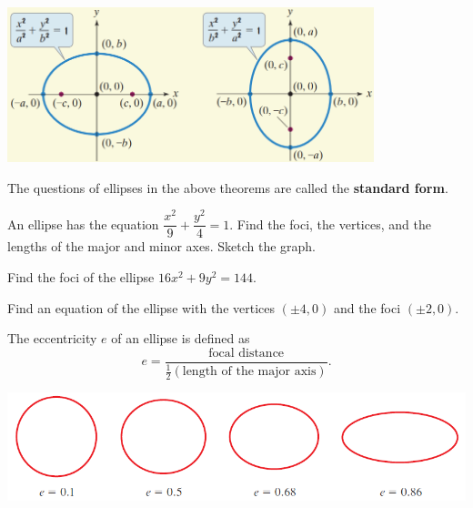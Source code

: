 \begin{center}
    \includegraphics[width=0.8\textwidth,keepaspectratio]{figs/EllipseGraphs.png}
\end{center}

The questions of ellipses in the above theorems are called the \textbf{standard form}.

\begin{example}
    An ellipse has the equation $\dfrac{x^2}{9}+\dfrac{y^2}{4}=1$.
    Find the foci, the vertices, and the lengths of the major and minor axes. Sketch the graph.
\end{example}
\vspace*{6\baselineskip}

\begin{example}
    Find the foci of the ellipse $16x^2+9y^2=144$.
\end{example}
\vspace*{6\baselineskip}

\begin{example}
    Find an equation of the ellipse with the vertices $(\pm 4, 0)$ and the foci $(\pm 2, 0)$.
\end{example}
\vspace*{6\baselineskip}

\begin{definition}
    The eccentricity $e$ of an ellipse is defined as
    \[e=\dfrac{\text{focal distance}}{\frac12\left(\text{length of the major axis}\right)}.\]
    \begin{center}
        \includegraphics[scale=0.8]{figs/EllipseWithVariousEccentricities.png}
    \end{center}
\end{definition}

